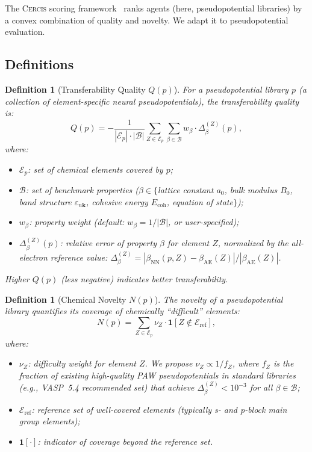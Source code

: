 \documentclass[11pt,a4paper]{article}
\newtheorem{definition}[theorem]{Definition}
\theoremstyle{definition}
\newcommand{\Cercis}{\textsc{Cercis}}
\newcommand{\ind}[1]{\mathbf{1}[#1]}
\begin{document}
The \Cercis{} scoring framework~\cite{SCX2025} ranks agents (here, pseudopotential libraries) by a convex combination of quality and novelty. We adapt it to pseudopotential evaluation.

\subsection{Definitions}

\begin{definition}[Transferability Quality $Q(p)$]
For a pseudopotential library $p$ (a collection of element-specific neural pseudopotentials), the transferability quality is:
\begin{equation}\label{eq:Q}
Q(p) = -\frac{1}{|\mathcal{E}_p| \cdot |\mathcal{B}|} \sum_{Z \in \mathcal{E}_p} \sum_{\beta \in \mathcal{B}} w_\beta \cdot \Delta_\beta^{(Z)}(p),
\end{equation}
where:
\begin{itemize}
    \item $\mathcal{E}_p$: set of chemical elements covered by $p$;
    \item $\mathcal{B}$: set of benchmark properties ($\beta \in \{$lattice constant $a_0$, bulk modulus $B_0$, band structure $\varepsilon_{n\mathbf{k}}$, cohesive energy $E_{\mathrm{coh}}$, equation of state$\}$);
    \item $w_\beta$: property weight (default: $w_\beta = 1/|\mathcal{B}|$, or user-specified);
    \item $\Delta_\beta^{(Z)}(p)$: relative error of property $\beta$ for element $Z$, normalized by the all-electron reference value: $\Delta_\beta^{(Z)} = |\beta_{\mathrm{NN}}(p, Z) - \beta_{\mathrm{AE}}(Z)| / |\beta_{\mathrm{AE}}(Z)|$.
\end{itemize}
Higher $Q(p)$ (less negative) indicates better transferability.
\end{definition}

\begin{definition}[Chemical Novelty $N(p)$]
The novelty of a pseudopotential library quantifies its coverage of chemically ``difficult'' elements:
\begin{equation}\label{eq:N}
N(p) = \sum_{Z \in \mathcal{E}_p} \nu_Z \cdot \ind{Z \notin \mathcal{E}_{\mathrm{ref}}},
\end{equation}
where:
\begin{itemize}
    \item $\nu_Z$: difficulty weight for element $Z$. We propose $\nu_Z \propto 1/f_Z$, where $f_Z$ is the fraction of existing high-quality PAW pseudopotentials in standard libraries (e.g., VASP~5.4 recommended set) that achieve $\Delta_\beta^{(Z)} < 10^{-3}$ for all $\beta \in \mathcal{B}$;
    \item $\mathcal{E}_{\mathrm{ref}}$: reference set of well-covered elements (typically s- and p-block main group elements);
    \item $\ind{\cdot}$: indicator of coverage beyond the reference set.
\end{itemize}
\end{definition}
\end{document}
